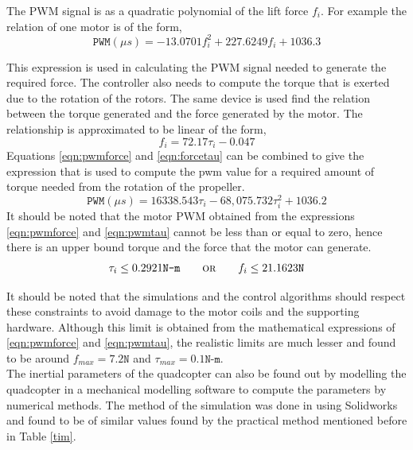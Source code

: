 \documentclass[letterpaper%
, twoside%
, 12pt%
,memoire%
, english%
,creativecommons,hyperref%
]{thETS}
\begin{document}
The PWM signal is as a quadratic polynomial of the lift force $f_i$. For example the relation of one motor is of the form, 
\begin{equation} \label{eqn:pwmforce}
\texttt{PWM} (\mu s)= -13.0701f_i^2+227.6249f_i +1036.3
\end{equation}

This expression is used in calculating the PWM signal needed to generate the required force. The controller also needs to compute the torque that is exerted due to the rotation of the rotors. The same device is used find the relation between the torque generated and the force generated by the motor. The relationship is approximated to be linear of the form, 
\begin{equation} \label{eqn:forcetau}
f_i=72.17\tau_i-0.047
\end{equation}
Equations \eqref{eqn:pwmforce} and \eqref{eqn:forcetau} can be combined to give the expression that is used to compute the pwm value for a required amount of torque needed from the rotation of the propeller. 
\begin{equation} \label{eqn:pwmtau}
\texttt{PWM} (\mu s)= 16338.543\tau_i -68,075.732\tau_i^2 +1036.2
\end{equation}
It should be noted that the motor PWM obtained from the expressions \eqref{eqn:pwmforce} and \eqref{eqn:pwmtau} cannot be less than or equal to zero, hence there is an upper bound torque and the force that the motor can generate. 
\begin{align}
\tau_i \leq 0.2921\texttt{N-m} \qquad \textsc{or}\qquad f_i \leq  21.1623\texttt{N}
\end{align}

It should be noted that the simulations and the control algorithms should respect these constraints to avoid damage to the motor coils and the supporting hardware. Although this limit is obtained from the mathematical expressions of \eqref{eqn:pwmforce} and \eqref{eqn:pwmtau}, the realistic limits are much lesser and found to be around $f_{max}=7.2\texttt{N}$ and $\tau_{max}=0.1\texttt{N-m}$.\\ 
The inertial parameters of the quadcopter can also be found out by modelling the quadcopter in a mechanical modelling software to compute the parameters by numerical methods. The method of the simulation was done in \citep{RN114} using Solidworks and found to be of similar values found by the practical method mentioned before in Table \ref{tim}.

\end{document}

